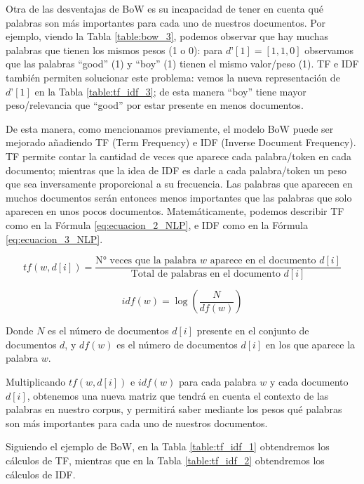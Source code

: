 \documentclass[12pt,a4paper]{article}
\begin{document}
\begin{sloppypar}
Otra de las desventajas de BoW es su incapacidad de tener en cuenta qué palabras son más importantes para cada uno de nuestros documentos\cite{NLP_2}. Por ejemplo, viendo la Tabla \ref{table:bow_3}, podemos observar que hay muchas palabras que tienen los mismos pesos (1 o 0): para $d’[1] = [1,1,0]$ observamos que las palabras ``good'' (1) y ``boy'' (1) tienen el mismo valor/peso (1). TF e IDF también permiten solucionar este problema: vemos la nueva representación de $d’[1]$ en la Tabla \ref{table:tf_idf_3}; de esta manera ``boy'' tiene mayor peso/relevancia que “good” por estar presente en menos documentos.

De esta manera, como mencionamos previamente, el modelo BoW puede ser mejorado añadiendo TF (Term Frequency) e IDF (Inverse Document Frequency). TF permite contar la cantidad de veces que aparece cada palabra/token en cada documento; mientras que la idea de IDF es darle a cada palabra/token un peso que sea inversamente proporcional a su frecuencia. Las palabras que aparecen en muchos documentos serán entonces menos importantes que las palabras que solo aparecen en unos pocos documentos\cite{apunte_uba}. Matemáticamente, podemos describir TF como en la Fórmula \ref{eq:ecuacion_2_NLP}, e IDF como en la Fórmula \ref{eq:ecuacion_3_NLP}.   

\begin{equation}\label{eq:ecuacion_2_NLP}
tf (w, d[i]) = \frac{\text{N° veces que la palabra $w$ aparece en el documento } d[i]} {{\text{Total de palabras en el documento } d[i]}}
\end{equation}

\begin{equation}\label{eq:ecuacion_3_NLP}
idf(w) = \log{(\frac{N}{df(w)})}
\end{equation}

Donde $N$ es el número de documentos $d[i]$ presente en el conjunto de documentos $d$, y $df(w)$ es el número de documentos $d[i]$ en los que aparece la palabra $w$.

Multiplicando $tf(w,d[i])$ e $idf(w)$ para cada palabra $w$ y cada documento $d[i]$, obtenemos una nueva matriz que tendrá en cuenta el contexto de las palabras en nuestro corpus, y permitirá saber mediante los pesos qué palabras son más importantes para cada uno de nuestros documentos.

Siguiendo el ejemplo de BoW, en la Tabla \ref{table:tf_idf_1} obtendremos los cálculos de TF, mientras que en la Tabla \ref{table:tf_idf_2} obtendremos los cálculos de IDF.


\end{sloppypar}
\end{document}
